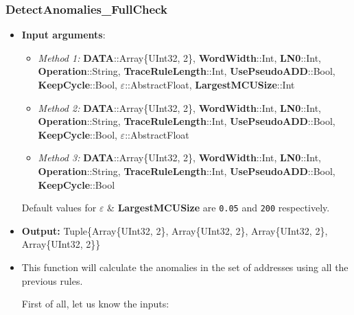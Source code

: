  \subsubsection*{DetectAnomalies\_FullCheck}\label{Fun:DetectAnomaliesFullCheck}
 \begin{itemize}
 	\item \textbf{Input arguments}:
 	\begin{itemize}
 		\item  \textit{Method 1: }\textbf{DATA}::Array\{UInt32, 2\}, 
 		\textbf{WordWidth}::Int,
 		\textbf{LN0}::Int, \\
 		\textbf{Operation}::String,
 		\textbf{TraceRuleLength}::Int,
 		\textbf{UsePseudoADD}::Bool,\\
 		\textbf{KeepCycle}::Bool,
 		\textbf{\(\varepsilon\)}::AbstractFloat,
 		\textbf{LargestMCUSize}::Int
 		\item  \textit{Method 2: }\textbf{DATA}::Array\{UInt32, 2\}, 
 		\textbf{WordWidth}::Int,
 		\textbf{LN0}::Int, \\
 		\textbf{Operation}::String,
 		\textbf{TraceRuleLength}::Int,
 		\textbf{UsePseudoADD}::Bool, \\
 		\textbf{KeepCycle}::Bool,
 		\textbf{\(\varepsilon\)}::AbstractFloat
 		\item  \textit{Method 3: }\textbf{DATA}::Array\{UInt32, 2\}, 
 		\textbf{WordWidth}::Int,
 		\textbf{LN0}::Int, \\
 		\textbf{Operation}::String,
 		\textbf{TraceRuleLength}::Int,
 		\textbf{UsePseudoADD}::Bool,\\
 		\textbf{KeepCycle}::Bool
 	\end{itemize}
 	
 	Default values for \textbf{\(\varepsilon\)} \& 	\textbf{LargestMCUSize} are \texttt{0.05} and \texttt{200} respectively.
 	\item \textbf{Output: } Tuple\{Array\{UInt32, 2\}, Array\{UInt32, 2\}, Array\{UInt32, 2\}, Array\{UInt32, 2\}\}	
 	\item This function will calculate the anomalies in the set of addresses using all the previous rules.
 	 
 	First of all, let us know the inputs:
 	\begin{itemize}
 		

\end{itemize}
\end{itemize}
